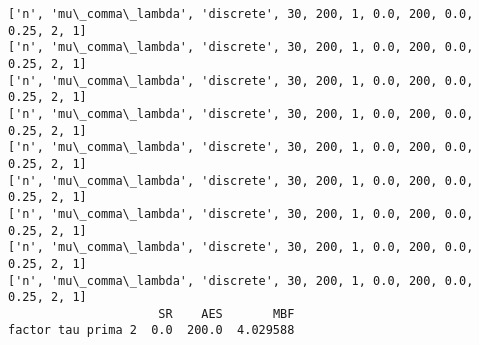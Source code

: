 \documentclass[11pt]{article}
\begin{document}
\begin{Verbatim}[commandchars=\\\{\}]
['n', 'mu\_comma\_lambda', 'discrete', 30, 200, 1, 0.0, 200, 0.0, 0.25, 2, 1]
['n', 'mu\_comma\_lambda', 'discrete', 30, 200, 1, 0.0, 200, 0.0, 0.25, 2, 1]
['n', 'mu\_comma\_lambda', 'discrete', 30, 200, 1, 0.0, 200, 0.0, 0.25, 2, 1]
['n', 'mu\_comma\_lambda', 'discrete', 30, 200, 1, 0.0, 200, 0.0, 0.25, 2, 1]
['n', 'mu\_comma\_lambda', 'discrete', 30, 200, 1, 0.0, 200, 0.0, 0.25, 2, 1]
['n', 'mu\_comma\_lambda', 'discrete', 30, 200, 1, 0.0, 200, 0.0, 0.25, 2, 1]
['n', 'mu\_comma\_lambda', 'discrete', 30, 200, 1, 0.0, 200, 0.0, 0.25, 2, 1]
['n', 'mu\_comma\_lambda', 'discrete', 30, 200, 1, 0.0, 200, 0.0, 0.25, 2, 1]
['n', 'mu\_comma\_lambda', 'discrete', 30, 200, 1, 0.0, 200, 0.0, 0.25, 2, 1]
                     SR    AES       MBF
factor tau prima 2  0.0  200.0  4.029588

    \end{Verbatim}
\end{document}
